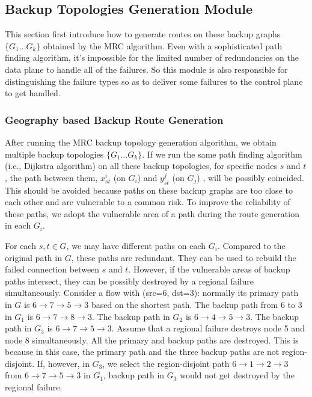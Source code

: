 \documentclass[10pt,journal]{IEEEtran}
\begin{document}
\subsection{Backup Topologies Generation Module}
This section first introduce how to generate routes on these backup graphs $\{G_1 \ldots G_k\}$ obtained by the MRC algorithm. Even with a sophisticated path finding algorithm, it's impossible for the limited number of redundancies on the data plane to handle all of the failures. So this module is also responsible for distinguishing the failure types so as to deliver some failures to the control plane to get handled.
\subsubsection{Geography based Backup Route Generation}
After running the MRC backup topology generation algorithm, we obtain multiple backup topologies $\{G_1 \ldots G_k\}$. If we run the same path finding algorithm (i.e., Dijkstra algorithm) on all these backup topologies, for specific nodes $s$ and $t$, the path between them, $x_{st}^{i}$ (on $G_i$) and $y_{st}^{j}$ (on $G_j$) , will be possibly coincided. This should be avoided because paths on these backup graphs are too close to each other and are vulnerable to a common risk. To improve the reliability of these paths,
we adopt the vulnerable area of  a path during the route generation in each $G_i$.

For each $s, t\in G$, we may have different paths on each $G_i$. Compared to the original path in $G$, these paths are redundant. They can be used to rebuild the failed connection between $s$ and $t$. However, if the vulnerable areas of backup paths intersect, they can be possibly destroyed by a regional failure simultaneously.
Consider a flow with (src=6, dst=3): normally its primary path in $G$ is $6\rightarrow 7\rightarrow 5\rightarrow 3$ based on the shortest path. The backup path from $6$ to $3$ in $G_1$ is $6\rightarrow 7\rightarrow 8\rightarrow 3$. The backup path in $G_2$ is $6\rightarrow 4\rightarrow 5\rightarrow 3$. The backup path in $G_3$ is $6\rightarrow 7\rightarrow 5\rightarrow 3$. Assume that a regional failure destroys node 5 and node 8 simultaneously. All the primary and backup paths are destroyed. This is because in this case, the primary path and the three backup paths are not region-disjoint. If, however, in $G_3$, we select the region-disjoint path $6\rightarrow 1\rightarrow 2\rightarrow 3$ from $6\rightarrow 7\rightarrow 5\rightarrow 3$ in $G_1$, backup path in $G_3$ would not get destroyed by the regional failure.
\end{document}
